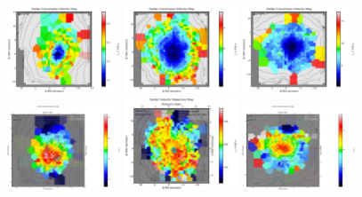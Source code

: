 \begin{figure}
      \\
      \includegraphics[width=0.3\textwidth]{chapter4/Vmaps/ngc3100_stellar_vel_uncert.png}
      \includegraphics[width=0.3\textwidth]{chapter4/Vmaps/ngc3557_stellar_vel_uncert.png}
      \includegraphics[width=0.3\textwidth]{chapter4/Vmaps/ngc7075_stellar_vel_uncert.png}
      \\
      \includegraphics[width=0.3\textwidth]{chapter4/Vmaps/ngc3100_stellar_sigma.png}
      \includegraphics[width=0.3\textwidth]{chapter4/Vmaps/ngc3557_stellar_sigma.png}
      \includegraphics[width=0.3\textwidth]{chapter4/Vmaps/ngc7075_stellar_sigma.png}

\end{figure}
